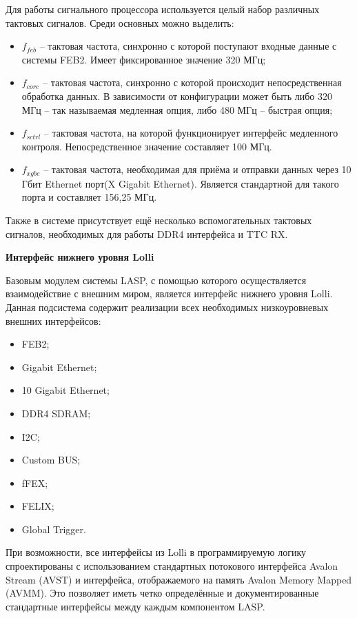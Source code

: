 Для работы сигнального процессора используется целый набор различных тактовых сигналов. Среди основных можно выделить:
\begin{itemize}
    \item $f_{feb}$ -- тактовая частота, синхронно с которой поступают входные данные с системы FEB2. Имеет фиксированное значение 320 МГц;
    \item $f_{core}$ --  тактовая частота, синхронно с которой происходит непосредственная обработка данных. В зависимости от конфигурации может быть либо 320 МГц -- так называемая медленная опция, либо 480 МГц -- быстрая опция;
    \item $f_{sctrl}$ -- тактовая частота, на которой функционирует интерфейс медленного контроля. Непосредственное значение составляет 100 МГц.
    \item $f_{xgbe}$ -- тактовая частота, необходимая для приёма и отправки данных через 10 Гбит Ethernet порт(X Gigabit Ethernet). Является стандартной для такого порта и составляет 156,25 МГц.
\end{itemize}\par
Также в системе присутствует ещё несколько вспомогательных тактовых сигналов, необходимых для работы DDR4 интерфейса и TTC RX.\par
\textbf{Интерфейс нижнего уровня Lolli}\par
Базовым модулем системы LASP, с помощью которого осуществляется взаимодействие с внешним миром, является интерфейс нижнего уровня Lolli. Данная подсистема содержит реализации всех необходимых низкоуровневых внешних интерфейсов:\par
\begin{itemize}
    \item FEB2;
    \item Gigabit Ethernet;
    \item 10 Gigabit Ethernet;
    \item DDR4 SDRAM;
    \item I2C;
    \item Custom BUS;
    \item fFEX;
    \item FELIX;
    \item Global Trigger.
\end{itemize}\par
При возможности, все интерфейсы из Lolli в программируемую логику спроектированы с использованием стандартных потокового интерфейса Avalon Stream (AVST) и интерфейса, отображаемого на память Avalon Memory Mapped (AVMM). Это позволяет иметь четко определённые и документированные стандартные интерфейсы между каждым компонентом LASP.\par
